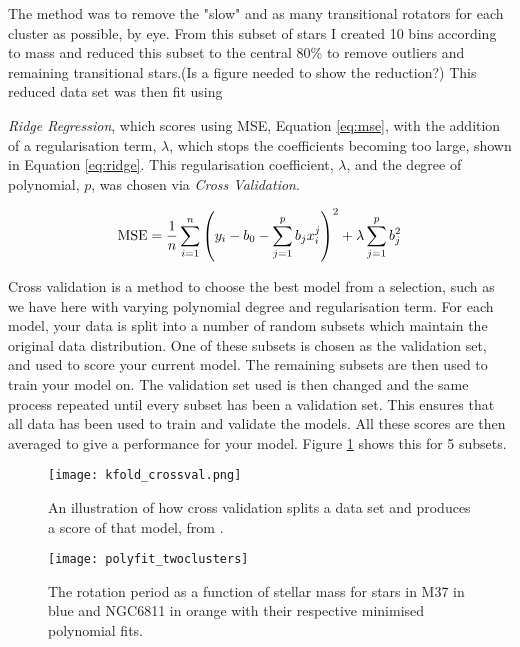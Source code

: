 \documentclass[fleqn,usenatbib]{mnras}
\begin{document}
The method was to remove the "slow" and as many transitional rotators for each cluster as possible, by eye.
From this subset of stars I created 10 bins according to mass and reduced this subset to the central 80\% to remove outliers and remaining transitional stars.(Is a figure needed to show the reduction?)
This reduced data set was then fit using {\textit{Ridge Regression}, which scores using MSE, Equation \ref{eq:mse}, with the addition of a regularisation term, $\lambda$, which stops the coefficients becoming too large, shown in Equation \ref{eq:ridge}.
This regularisation coefficient, $\lambda$, and the degree of polynomial, $p$, was chosen via \textit{Cross Validation}.

\begin{equation}
	\label{eq:ridge}
	\textup{MSE} = \frac{1}{n}\sum_{i = 1}^n \left(y_i - b_0 - \sum_{j = 1}^p b_jx_i^j \right)^2 + \lambda \sum_{j = 1}^p b^2_j
\end{equation}

Cross validation is a method to choose the best model from a selection, such as we have here with varying polynomial degree and regularisation term.
For each model, your data is split into a number of random subsets which maintain the original data distribution.
One of these subsets is chosen as the validation set, and used to score your current model.
The remaining subsets are then used to train your model on.
The validation set used is then changed and the same process repeated until every subset has been a validation set.
This ensures that all data has been used to train and validate the models.
All these scores are then averaged to give a performance for your model.
Figure \ref{fig:cross_validation} shows this for 5 subsets.

\begin{figure}
	\texttt{[image: kfold\_crossval.png]}
	\caption{An illustration of how cross validation splits a data set and produces a score of that model, from \protect\cite{CrossVal}.}
	\label{fig:cross_validation}
\end{figure}



\begin{figure}
	\texttt{[image: polyfit\_twoclusters]}
	\caption{The rotation period as a function of stellar mass for stars in  M37 in blue and NGC6811 in orange with their respective minimised polynomial fits.}
	\label{fig:polyfit_twoclusters}
\end{figure}

}
\end{document}
